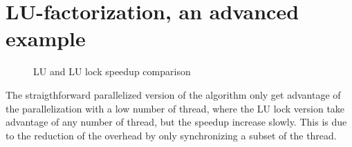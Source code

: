 \chapter{LU-factorization, an advanced example}

\begin{figure}[!h]
  \begin{center}
  \end{center}
  \caption{LU and LU lock speedup comparison}
  \label{fig:lu}
\end{figure}

The straigthforward parallelized version of the algorithm only get advantage of the parallelization with a low number of thread, where the LU lock version take advantage of any number of thread, but the speedup increase slowly. This is due to the reduction of the overhead by only synchronizing a subset of the thread.

